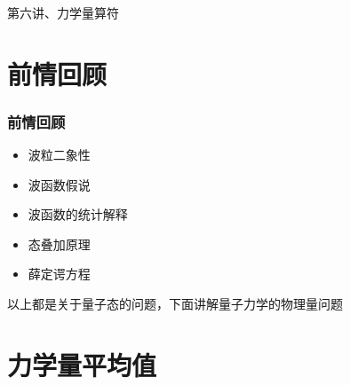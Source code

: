 \begin{frame}
    \frametitle{}
    \begin{center}
    { {\huge 第六讲、力学量算符}}
    \end{center}    
\end{frame}


\section{前情回顾}

\begin{frame}
    \frametitle{前情回顾}
    \begin{itemize}
        \item 波粒二象性
        \item 波函数假说
        \item 波函数的统计解释
        \item 态叠加原理
        \item 薛定谔方程
    \end{itemize}
    以上都是关于量子态的问题，下面讲解量子力学的物理量问题
\end{frame} 

\section{力学量平均值}

